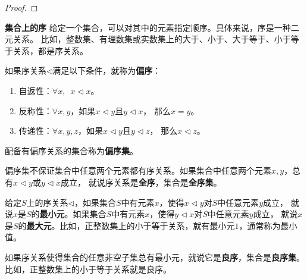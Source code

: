 \documentclass[12pt,UTF8]{ctexbook}
\begin{document}
\begin{appendix}
\begin{proof}
\end{proof}

\begin{df}{\textbf{集合上的序}}
    给定一个集合，可以对其中的元素指定顺序。具体来说，序是一种二元关系。
    比如，整数集、有理数集或实数集上的大于、小于、大于等于、小于等于关系，都是序关系。

    如果序关系$\triangleleft$满足以下条件，就称为\textbf{偏序}：
    \begin{enumerate}
        \item 自返性：$\forall x, \,\,\, x \triangleleft x$。
        \item 反称性：$\forall x, y$，如果$x \triangleleft y$且$y \triangleleft x$， 那么$x = y$。
        \item 传递性：$\forall x, y, z$，如果$x \triangleleft y$且$y \triangleleft z$， 那么$x \triangleleft z$。
    \end{enumerate}
    配备有偏序关系的集合称为\textbf{偏序集}。

    偏序集不保证集合中任意两个元素都有序关系。如果集合中任意两个元素$x, y$，总有$x \triangleleft y$或$y \triangleleft x$成立，
    就说序关系是\textbf{全序}，集合是\textbf{全序集}。

    给定$S$上的序关系$\triangleleft$，如果集合$S$中有元素$x$，使得$x \triangleleft y$对$S$中任意元素$y$成立，
    就说$x$是$S$的\textbf{最小元}。如果集合$S$中有元素$x$，使得$y \triangleleft x$对$S$中任意元素$y$成立，
    就说$x$是$S$的\textbf{最大元}。比如，正整数集上的小于等于关系，就有最小元$1$，通常称为最小值。
    
    如果序关系使得集合的任意非空子集总有最小元，就说它是\textbf{良序}，集合是\textbf{良序集}。
    比如，正整数集上的小于等于关系就是良序。


\end{df}



\end{appendix}
\end{document}
